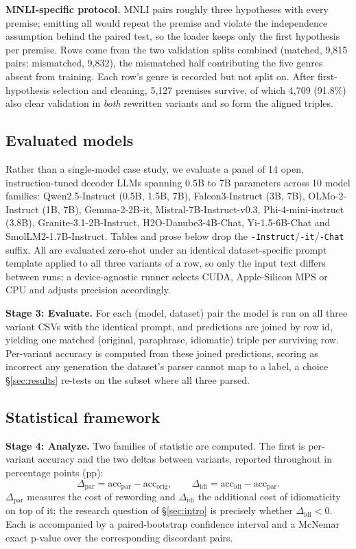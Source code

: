 \documentclass{article}   %
\begin{document}
\textbf{MNLI-specific protocol.} MNLI pairs roughly three hypotheses with every
premise; emitting all would repeat the premise and violate the independence
assumption behind the paired test, so the loader keeps only the first hypothesis
per premise. Rows come from the two validation splits combined (matched, 9{,}815
pairs; mismatched, 9{,}832), the mismatched half contributing the five genres
absent from training. Each row's genre is recorded but not split on. After
first-hypothesis selection and cleaning, 5{,}127 premises survive, of which
4{,}709 (91.8\%) also clear validation in \emph{both} rewritten variants and so
form the aligned triples.

\subsection{Evaluated models}

Rather than a single-model case study, we evaluate a panel of 14 open,
instruction-tuned decoder LLMs spanning 0.5B to 7B parameters across 10 model
families: Qwen2.5-Instruct (0.5B, 1.5B, 7B), Falcon3-Instruct (3B, 7B),
OLMo-2-Instruct (1B, 7B), Gemma-2-2B-it, Mistral-7B-Instruct-v0.3,
Phi-4-mini-instruct (3.8B), Granite-3.1-2B-Instruct, H2O-Danube3-4B-Chat,
Yi-1.5-6B-Chat and SmolLM2-1.7B-Instruct. Tables and prose below drop the
\texttt{-Instruct}/\texttt{-it}/\texttt{-Chat} suffix. All are evaluated
zero-shot under an identical dataset-specific prompt template applied to all
three variants of a row, so only the input text differs between runs; a
device-agnostic runner selects CUDA, Apple-Silicon MPS or CPU and adjusts
precision accordingly.

\textbf{Stage 3: Evaluate.} For each (model, dataset) pair the model is run on
all three variant CSVs with the identical prompt, and predictions are joined by
row id, yielding one matched (original, paraphrase, idiomatic) triple per
surviving row. Per-variant accuracy is computed from these joined predictions,
scoring as incorrect any generation the dataset's parser cannot map to a label,
a choice \S\ref{sec:results} re-tests on the subset where all three parsed.

\subsection{Statistical framework}
\label{sec:stats}

\textbf{Stage 4: Analyze.} Two families of statistic are computed. The first
is per-variant accuracy and the two deltas between variants, reported
throughout in percentage points (pp):
\begin{equation}
  \Delta_{\text{par}} = \text{acc}_{\text{par}} - \text{acc}_{\text{orig}},
  \qquad
  \Delta_{\text{idi}} = \text{acc}_{\text{idi}} - \text{acc}_{\text{par}} .
  \label{eq:deltas}
\end{equation}
$\Delta_{\text{par}}$ measures the cost of rewording and
$\Delta_{\text{idi}}$ the additional cost of idiomaticity on top of it; the
research question of \S\ref{sec:intro} is precisely whether
$\Delta_{\text{idi}} < 0$. Each is accompanied by a paired-bootstrap
confidence interval and a McNemar exact p-value over the corresponding
discordant pairs.
\end{document}
